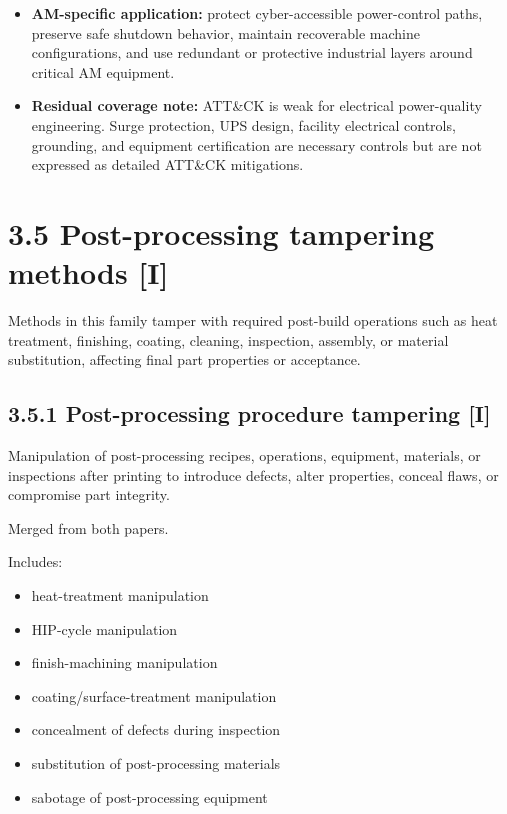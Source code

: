 \documentclass[10pt,a4paper,oneside]{report}
\begin{document}
\begin{itemize}
\item \textbf{AM-specific application:} protect cyber-accessible power-control paths, preserve safe shutdown behavior, maintain recoverable machine configurations, and use redundant or protective industrial layers around critical AM equipment.
\end{itemize}

\begin{itemize}
\item \textbf{Residual coverage note:} ATT\&CK is weak for electrical power-quality engineering. Surge protection, UPS design, facility electrical controls, grounding, and equipment certification are necessary controls but are not expressed as detailed ATT\&CK mitigations.
\end{itemize}


\section{3.5 Post-processing tampering methods [I]}


Methods in this family tamper with required post-build operations such as heat treatment, finishing, coating, cleaning, inspection, assembly, or material substitution, affecting final part properties or acceptance.


\subsection{3.5.1 Post-processing procedure tampering [I]}


Manipulation of post-processing recipes, operations, equipment, materials, or inspections after printing to introduce defects, alter properties, conceal flaws, or compromise part integrity.

Merged from both papers.

Includes:

\begin{itemize}
\item heat-treatment manipulation
\item HIP-cycle manipulation
\item finish-machining manipulation
\item coating/surface-treatment manipulation
\item concealment of defects during inspection
\item substitution of post-processing materials
\item sabotage of post-processing equipment
\end{itemize}
\end{document}
